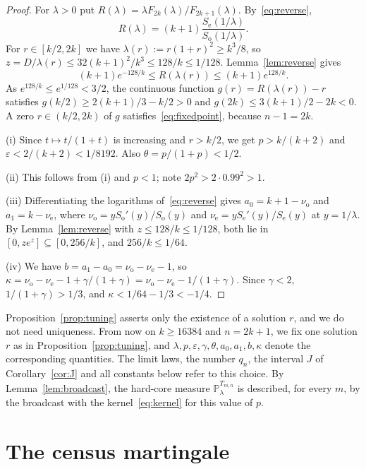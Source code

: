 \documentclass{amsart}
\theoremstyle{definition}
\theoremstyle{remark}
\numberwithin{equation}{section}
\newcommand{\eps}{\varepsilon}
\newcommand{\Prob}{\mathbb{P}}
\newcommand{\nuo}{\nu_{\mathrm{o}}}
\newcommand{\nue}{\nu_{\mathrm{e}}}
\begin{document}
\begin{proof}
For $\lambda>0$ put $R(\lambda)=\lambda F_{2k}(\lambda)/F_{2k+1}(\lambda)$. By~\eqref{eq:reverse},
\[
R(\lambda)=(k+1)\frac{S_{\mathrm e}(1/\lambda)}{S_{\mathrm o}(1/\lambda)} .
\]
For $r\in[k/2,2k]$ we have $\lambda(r):=r(1+r)^2\ge k^3/8$, so $z=D/\lambda(r)\le32(k+1)^2/k^3\le128/k\le1/128$. Lemma~\ref{lem:reverse} gives
\[
(k+1)e^{-128/k}\le R(\lambda(r))\le(k+1)e^{128/k}.
\]
As $e^{128/k}\le e^{1/128}<3/2$, the continuous function $g(r)=R(\lambda(r))-r$ satisfies $g(k/2)\ge 2(k+1)/3-k/2>0$ and $g(2k)\le3(k+1)/2-2k<0$. A zero $r\in(k/2,2k)$ of $g$ satisfies~\eqref{eq:fixedpoint}, because $n-1=2k$.

(i) Since $t\mapsto t/(1+t)$ is increasing and $r>k/2$, we get $p>k/(k+2)$ and $\eps<2/(k+2)<1/8192$. Also $\theta=p/(1+p)<1/2$.

(ii) This follows from (i) and $p<1$; note $2p^2>2\cdot0.99^2>1$.

(iii) Differentiating the logarithms of~\eqref{eq:reverse} gives $a_0=k+1-\nuo$ and $a_1=k-\nue$, where $\nuo=yS_{\mathrm o}'(y)/S_{\mathrm o}(y)$ and $\nue=yS_{\mathrm e}'(y)/S_{\mathrm e}(y)$ at $y=1/\lambda$. By Lemma~\ref{lem:reverse} with $z\le128/k\le1/128$, both lie in $[0,ze^z]\subseteq[0,256/k]$, and $256/k\le1/64$.

(iv) We have $b=a_1-a_0=\nuo-\nue-1$, so $\kappa=\nuo-\nue-1+\gamma/(1+\gamma)=\nuo-\nue-1/(1+\gamma)$. Since $\gamma<2$, $1/(1+\gamma)>1/3$, and $\kappa<1/64-1/3<-1/4$.
\end{proof}

Proposition~\ref{prop:tuning} asserts only the existence of a solution $r$, and we do not need uniqueness. From now on $k\ge16384$ and $n=2k+1$, we fix one solution $r$ as in Proposition~\ref{prop:tuning}, and $\lambda,p,\eps,\gamma,\theta,a_0,a_1,b,\kappa$ denote the corresponding quantities. The limit laws, the number $q_n$, the interval $J$ of Corollary~\ref{cor:J} and all constants below refer to this choice. By Lemma~\ref{lem:broadcast}, the hard-core measure $\Prob^{T_{m,n}}_\lambda$ is described, for every $m$, by the broadcast with the kernel~\eqref{eq:kernel} for this value of $p$.

\section{The census martingale}\label{sec:census}
\end{document}
